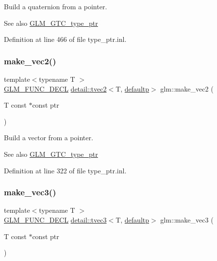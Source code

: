 Build a quaternion from a pointer. \begin{DoxySeeAlso}{See also}
\hyperlink{group__gtc__type__ptr}{G\+L\+M\+\_\+\+G\+T\+C\+\_\+type\+\_\+ptr} 
\end{DoxySeeAlso}


Definition at line 466 of file type\+\_\+ptr.\+inl.

\mbox{\label{group__gtc__type__ptr_ga70f570befb4773ba3a658b76f9fdd6ab}} 
\subsubsection{\texorpdfstring{make\+\_\+vec2()}{make\_vec2()}}
{\footnotesize\ttfamily template$<$typename T $>$ \\
\hyperlink{setup_8hpp_ab2d052de21a70539923e9bcbf6e83a51}{G\+L\+M\+\_\+\+F\+U\+N\+C\+\_\+\+D\+E\+CL} \hyperlink{structglm_1_1detail_1_1tvec2}{detail\+::tvec2}$<$T, \hyperlink{namespaceglm_a0f04f086094c747d227af4425893f545a9d21ccd8b5a009ec7eb7677befc3bf51}{defaultp}$>$ glm\+::make\+\_\+vec2 (\begin{DoxyParamCaption}\item[{T const $\ast$const}]{ptr }\end{DoxyParamCaption})}

Build a vector from a pointer. \begin{DoxySeeAlso}{See also}
\hyperlink{group__gtc__type__ptr}{G\+L\+M\+\_\+\+G\+T\+C\+\_\+type\+\_\+ptr} 
\end{DoxySeeAlso}


Definition at line 322 of file type\+\_\+ptr.\+inl.

\mbox{\label{group__gtc__type__ptr_gad91a6a0fe324630b151208703a1591ed}} 
\subsubsection{\texorpdfstring{make\+\_\+vec3()}{make\_vec3()}}
{\footnotesize\ttfamily template$<$typename T $>$ \\
\hyperlink{setup_8hpp_ab2d052de21a70539923e9bcbf6e83a51}{G\+L\+M\+\_\+\+F\+U\+N\+C\+\_\+\+D\+E\+CL} \hyperlink{structglm_1_1detail_1_1tvec3}{detail\+::tvec3}$<$T, \hyperlink{namespaceglm_a0f04f086094c747d227af4425893f545a9d21ccd8b5a009ec7eb7677befc3bf51}{defaultp}$>$ glm\+::make\+\_\+vec3 (\begin{DoxyParamCaption}\item[{T const $\ast$const}]{ptr }\end{DoxyParamCaption})}

